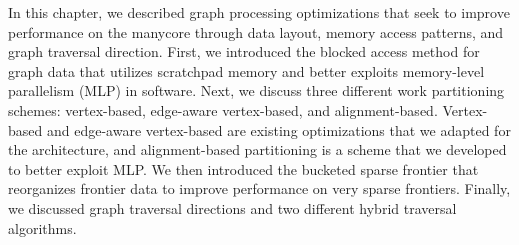 In this chapter, we described graph processing optimizations that seek to improve performance on the \hb manycore through data layout, memory access patterns, and graph traversal direction.
First, we introduced the blocked access method for graph data that utilizes scratchpad memory and better exploits memory-level parallelism (MLP) in software.
Next, we discuss three different work partitioning schemes: vertex-based, edge-aware vertex-based, and alignment-based.
Vertex-based and edge-aware vertex-based are existing optimizations that we adapted for the \hb architecture, and alignment-based partitioning is a scheme that we developed to better exploit MLP.
We then introduced the bucketed sparse frontier that reorganizes frontier data to improve performance on very sparse frontiers.
Finally, we discussed graph traversal directions and two different hybrid traversal algorithms.

